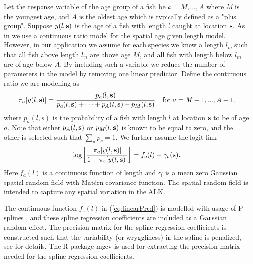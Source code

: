 \documentclass[a4paper 12pt]{article}
\numberwithin{equation}{section}
\begin{document}
Let the response variable of the age group of a fish be $a = M,...,A$ where $M$ is the youngest age, and $A$ is the oldest age which is typically defined as a "plus group". Suppose $y(l,{\bf s})$ is the age  of a fish with length $l$ caught at location ${\bf s}$. As in \citet{berg2012spatial} we use a continuous ratio model for the spatial age given length model. However, in our application we assume for each species we know a length $l_m$ such that all fish above length $l_m$ are above age $M$, and all fish with length below $l_m$ are of age below $A$. By including such a variable we reduce the number of parameters in the model by removing one linear predictor. Define the continuous ratio we are modelling as
\begin{equation}\label{eq:linearPred1}
\pi_a[y(l,{\bf s})] = \frac{p_a(l,{\bf s})}{p_a(l,{\bf s}) + \cdots + p_{A}(l,{\bf s}) +p_{M}(l,{\bf s}) } \vspace{ 4mm} \ \ \ \text{for } a =M+1,...,A-1 ,
\end{equation}
where \vspace{-5mm} $p_a(l,s)$ is the probability of a fish with length $l$ at location ${\bf s}$ to be of age $a$. Note that either $p_{A}(l,{\bf s})$ or $p_{M}(l,{\bf s})$ is known to be equal to zero, and the other is selected such that $\sum_a p_a = 1$. We further assume the logit link
\begin{equation}\label{eq:linearPred}
\log \left[ \frac{\pi_a[y(l,{\bf s})]}{1-\pi_a[y(l,{\bf s})]}\right] = f_a(l) + \gamma_a({\bf s}).
\end{equation}
Here $ f_a(l)$ is a continuous function of length and $\pmb{\gamma}$ is a mean zero Gaussian spatial random field with Mat\'{e}rn covariance function. The spatial random field is intended to capture any spatial variation in the ALK.



The continuous function $f_a(l)$ in (\ref{eq:linearPred}) is modelled with usage of P-splines \citep{wood2017generalized}, and these spline regression coefficients are included as a Gaussian random effect. The precision matrix for the spline regression coefficients is constructed such that the variability (or wryggliness) in the spline is penalized, see \citet[page 239]{wood2017generalized} for details. The R package mgcv \citep{wood2015package} is used for extracting the precision matrix needed for the spline regression coefficients.
\end{document}
